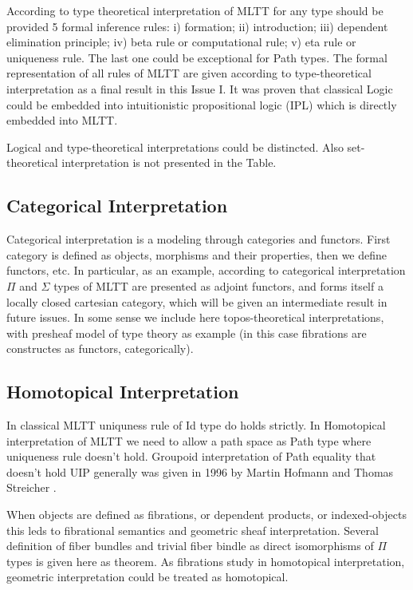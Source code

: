 \documentclass{article}
\theoremstyle{definition}
\begin{document}
According to type theoretical interpretation of MLTT for any type should be provided 5 formal
inference rules: i) formation; ii) introduction; iii) dependent elimination principle;
iv) beta rule or computational rule; v) eta rule or uniqueness rule. The last one could
be exceptional for Path types. The formal representation of all rules of MLTT
are given according to type-theoretical interpretation as a final result in this Issue I.
It was proven that classical Logic could be embedded into
intuitionistic propositional logic (IPL) which is directly embedded into MLTT.

Logical and type-theoretical interpretations could be distincted. Also
set-theoretical interpretation is not presented in the Table.


\subsection{Categorical Interpretation}

Categorical interpretation \cite{Curien14} is a modeling through categories and functors.
First category is defined as objects, morphisms and their properties, then
we define functors, etc. In particular, as an example, according to categorical
interpretation $\Pi$ and $\Sigma$ types of MLTT are presented as adjoint
functors, and forms itself a locally closed cartesian category, which will be given an
intermediate result in future issues. In some sense we include here
topos-theoretical interpretations, with presheaf model of type theory as
example (in this case fibrations are constructes as functors, categorically).

\subsection{Homotopical Interpretation}

In classical MLTT uniquness rule of Id type do holds strictly. In Homotopical
interpretation of MLTT we need to allow a path space as Path type where uniqueness
rule doesn't hold. Groupoid interpretation of Path equality that doesn't hold UIP generally
was given in 1996 by Martin Hofmann and Thomas Streicher \cite{Hofmann96}.

When objects are defined as fibrations, or dependent products, or indexed-objects
this leds to fibrational semantics and geometric sheaf interpretation. Several definition
of fiber bundles and trivial fiber bindle as direct isomorphisms of $\Pi$ types is
given here as theorem. As fibrations study in homotopical interpretation, geometric
interpretation could be treated as homotopical.
\end{document}

